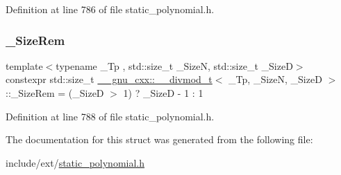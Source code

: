 Definition at line 786 of file static\+\_\+polynomial.\+h.

\mbox{\label{struct____gnu__cxx_1_1____divmod__t_a77870c1b7361b2b7511b0ef4d958826c}} 
\subsubsection{\texorpdfstring{\+\_\+\+Size\+Rem}{\_SizeRem}}
{\footnotesize\ttfamily template$<$typename \+\_\+\+Tp , std\+::size\+\_\+t \+\_\+\+SizeN, std\+::size\+\_\+t \+\_\+\+SizeD$>$ \\
constexpr std\+::size\+\_\+t \hyperlink{struct____gnu__cxx_1_1____divmod__t}{\+\_\+\+\_\+gnu\+\_\+cxx\+::\+\_\+\+\_\+divmod\+\_\+t}$<$ \+\_\+\+Tp, \+\_\+\+SizeN, \+\_\+\+SizeD $>$\+::\+\_\+\+Size\+Rem = (\+\_\+\+SizeD $>$ 1) ? \+\_\+\+SizeD -\/ 1 \+: 1\hspace{0.3cm}{\ttfamily [static]}}



Definition at line 788 of file static\+\_\+polynomial.\+h.



The documentation for this struct was generated from the following file\+:\begin{DoxyCompactItemize}
\item 
include/ext/\hyperlink{static__polynomial_8h}{static\+\_\+polynomial.\+h}\end{DoxyCompactItemize}

